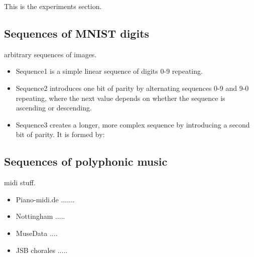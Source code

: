 This is the experiments section.

\subsection{Sequences of MNIST digits}
	arbitrary sequences of images.
	\begin{itemize}
		\item Sequence1 is a simple linear sequence of digits 0-9 repeating.
		\item Sequence2 introduces one bit of parity by alternating sequences 0-9 and 9-0 repeating, where the next value depends on whether the sequence is ascending or descending.
		\item Sequence3 creates a longer, more complex sequence by introducing a second bit of parity. It is formed by:
	\end{itemize}

\subsection{Sequences of polyphonic music}
	midi stuff.
	\begin{itemize}
		\item Piano-midi.de .......
		\item Nottingham .....
		\item MuseData ....
		\item JSB chorales .....
	\end{itemize}